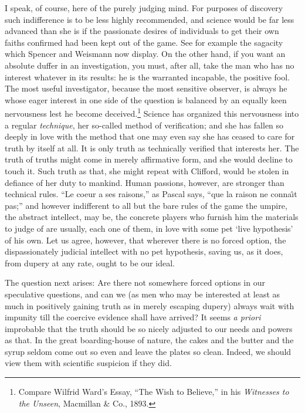 \documentclass[12pt]{article}
\begin{document}
I speak, of course, here of the purely judging mind.  For purposes of discovery such indifference is to be less highly recommended, and science would be far less advanced than she is if the passionate desires of individuals to get their own faiths confirmed had been kept out of the game.  See for example the sagacity which Spencer and Weismann now display.  On the other hand, if you want an absolute duffer in an investigation, you must, after all, take the man who has no interest whatever in its results: he is the warranted incapable, the positive fool.  The most useful investigator, because the most sensitive observer, is always he whose eager interest in one side of the question is balanced by an equally keen nervousness lest he become deceived.\footnote{Compare Wilfrid Ward's Essay, ``The Wish to Believe,'' in his \emph{Witnesses to the Unseen}, Macmillan \& Co., 1893.}  Science has organized this nervousness into a regular \emph{technique}, her so-called method of verification; and she has fallen so deeply in love with the method that one may even say she has ceased to care for truth by itself at all.  It is only truth as technically verified that interests her.  The truth of truths might come in merely affirmative form, and she would decline to touch it.  Such truth as that, she might repeat with Clifford, would be stolen in defiance of her duty to mankind.  Human passions, however, are stronger than technical rules.  ``Le coeur a ses raisons,'' as Pascal says, ``que la raison ne conna\^{\i}t pas;'' and however indifferent to all but the bare rules of the game the umpire, the abstract intellect, may be, the concrete players who furnish him the materials to judge of are usually, each one of them, in love with some pet `live hypothesis' of his own. Let us agree, however, that wherever there is no forced option, the  dispassionately judicial intellect with no pet hypothesis, saving us, as it does, from dupery at any rate, ought to be our ideal.

The question next arises: Are there not somewhere forced options in our speculative questions, and can we (as men who may be interested at least as much in positively gaining truth as in merely escaping dupery) always wait with impunity till the coercive evidence shall have arrived?  It seems \emph{a priori} improbable that the truth should be so nicely adjusted to our needs and powers as that.  In the great boarding-house of nature, the cakes and the butter and the syrup seldom come out so even and leave the plates so clean.  Indeed, we should view them with scientific suspicion if they did.
\end{document}
